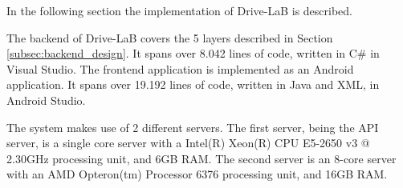 In the following section the implementation of Drive-LaB is described.

The backend of Drive-LaB covers the 5 layers described in Section \ref{subsec:backend_design}. It spans over 8.042 lines of code, written in C\# in Visual Studio. The frontend application is implemented as an Android application. It spans over 19.192 lines of code, written in Java and XML, in Android Studio.

The system  makes use of 2 different servers. The first server, being the API server, is a single core server with a Intel(R) Xeon(R) CPU E5-2650 v3 @ 2.30GHz processing unit, and 6GB RAM. The second server is an 8-core server with an AMD Opteron(tm) Processor 6376 processing unit, and 16GB RAM.
